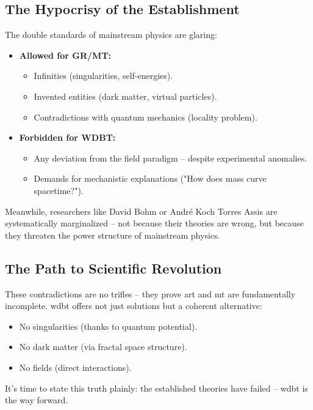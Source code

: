 \subsection{The Hypocrisy of the Establishment}
The double standards of mainstream physics are glaring:
\begin{itemize}
    \item \textbf{Allowed for GR/MT:}
    \begin{itemize}
        \item Infinities (singularities, self-energies).
        \item Invented entities (dark matter, virtual particles).
        \item Contradictions with quantum mechanics (locality problem).
    \end{itemize}
    \item \textbf{Forbidden for WDBT:}
    \begin{itemize}
        \item Any deviation from the field paradigm – despite experimental anomalies.
        \item Demands for mechanistic explanations ("How does mass curve spacetime?").
    \end{itemize}
\end{itemize}
Meanwhile, researchers like David Bohm or André Koch Torres Assis are systematically marginalized – not because their theories are wrong, but because they threaten the power structure of mainstream physics.

\subsection{The Path to Scientific Revolution}
These contradictions are no trifles – they prove \gls{art} and \gls{mt} are fundamentally incomplete. \gls{wdbt} offers not just solutions but a coherent alternative:
\begin{itemize}
    \item No singularities (thanks to quantum potential).
    \item No dark matter (via fractal space structure).
    \item No fields (direct interactions).
\end{itemize}
It’s time to state this truth plainly: the established theories have failed – \gls{wdbt} is the way forward.